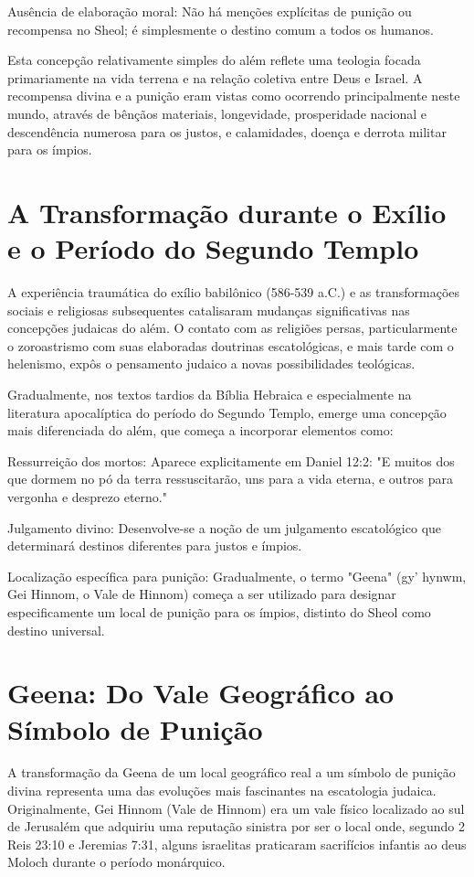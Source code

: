 Ausência de elaboração moral: Não há menções explícitas de punição ou recompensa no Sheol; é simplesmente o destino comum a todos os humanos.

Esta concepção relativamente simples do além reflete uma teologia focada primariamente na vida terrena e na relação coletiva entre Deus e Israel. A recompensa divina e a punição eram vistas como ocorrendo principalmente neste mundo, através de bênçãos materiais, longevidade, prosperidade nacional e descendência numerosa para os justos, e calamidades, doença e derrota militar para os ímpios.

\section{A Transformação durante o Exílio e o Período do Segundo Templo}

A experiência traumática do exílio babilônico (586-539 a.C.) e as transformações sociais e religiosas subsequentes catalisaram mudanças significativas nas concepções judaicas do além. O contato com as religiões persas, particularmente o zoroastrismo com suas elaboradas doutrinas escatológicas, e mais tarde com o helenismo, expôs o pensamento judaico a novas possibilidades teológicas.

Gradualmente, nos textos tardios da Bíblia Hebraica e especialmente na literatura apocalíptica do período do Segundo Templo, emerge uma concepção mais diferenciada do além, que começa a incorporar elementos como:

Ressurreição dos mortos: Aparece explicitamente em Daniel 12:2: "E muitos dos que dormem no pó da terra ressuscitarão, uns para a vida eterna, e outros para vergonha e desprezo eterno."

Julgamento divino: Desenvolve-se a noção de um julgamento escatológico que determinará destinos diferentes para justos e ímpios.

Localização específica para punição: Gradualmente, o termo "Geena" (gy' hynwm, Gei Hinnom, o Vale de Hinnom) começa a ser utilizado para designar especificamente um local de punição para os ímpios, distinto do Sheol como destino universal.


\section{Geena: Do Vale Geográfico ao Símbolo de Punição}

A transformação da Geena de um local geográfico real a um símbolo de punição divina representa uma das evoluções mais fascinantes na escatologia judaica. Originalmente, Gei Hinnom (Vale de Hinnom) era um vale físico localizado ao sul de Jerusalém que adquiriu uma reputação sinistra por ser o local onde, segundo 2 Reis 23:10 e Jeremias 7:31, alguns israelitas praticaram sacrifícios infantis ao deus Moloch durante o período monárquico.


